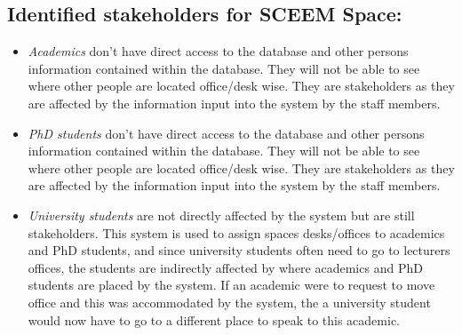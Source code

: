 \documentclass[11pt,a4paper]{article}
\begin{document}
\subsection{Identified stakeholders for SCEEM Space:}
\begin{itemize}
    \item \textit{Academics} don’t have direct access to the database and other persons information contained within the database. They will not be able to see where other people are located office/desk wise. They are stakeholders as they are affected by the information input into the system by the staff members.
    \item \textit{PhD students} don’t have direct access to the database and other persons information contained within the database. They will not be able to see where other people are located office/desk wise. They are stakeholders as they are affected by the information input into the system by the staff members.
    \item \textit{University students} are not directly affected by the system but are still stakeholders. This system is used to assign spaces desks/offices to academics and PhD students, and since university students often need to go to lecturers offices, the students are indirectly affected by where academics and PhD students are placed by the system. If an academic were to request to move office and this was accommodated by the system, the a university student would now have to go to a different place to speak to this academic.
\end{itemize}
\end{document}
